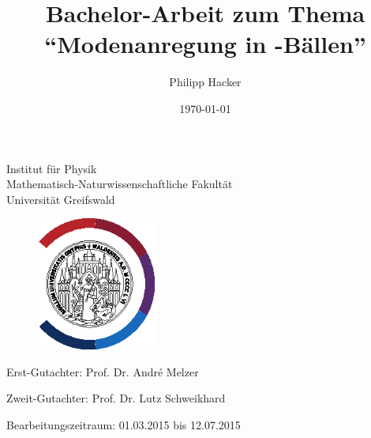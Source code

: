 \documentclass[numbers=noenddot,a4paper]{scrartcl}
\title{Bachelor-Arbeit zum Thema \enquote{Modenanregung in \tilt{Yukawa}-Bällen}} %
\author{Philipp Hacker} %
\date{\today}
\begin{document}
	\maketitle

	\begin{center}

		Institut für Physik\\
		Mathematisch-Naturwissenschaftliche Fakultät\\
		Universität Greifswald

	\end{center}
	
	\vspace{0.5cm}

	\begin{figure}[H]
			\centering
			\includegraphics[width=0.35\textwidth]{figs/unilogo_NEU_schwarz.eps}
	\end{figure}

	\vspace{0.5cm}

	\begin{center}

			\hspace{-0.55cm} Erst-Gutachter: Prof. Dr. André Melzer \\ \vspace{0.25cm} %

			Zweit-Gutachter: Prof. Dr. Lutz Schweikhard \\ \vspace{0.25cm} %

			Bearbeitungszeitraum: 01.03.2015 bis 12.07.2015 \\ \vspace{0.25cm} %

%			
%			

	\end{center}
\end{document}
